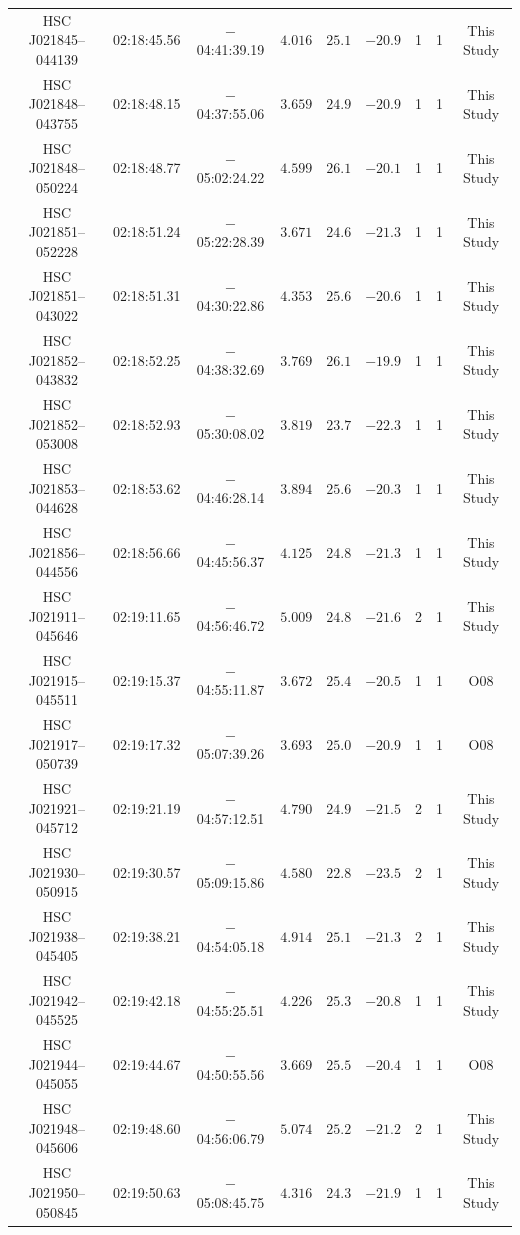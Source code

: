 \documentclass[]{pasj01}
\begin{document}
{\begin{longtable}{ccccccccc}
HSC J021845--044139 & 02:18:45.56 & $-$04:41:39.19 & $4.016$ & $25.1$ & $-20.9$ & 1 & 1 & This Study \\
HSC J021848--043755 & 02:18:48.15 & $-$04:37:55.06 & $3.659$ & $24.9$ & $-20.9$ & 1 & 1 & This Study \\
HSC J021848--050224 & 02:18:48.77 & $-$05:02:24.22 & $4.599$ & $26.1$ & $-20.1$ & 1 & 1 & This Study \\
HSC J021851--052228 & 02:18:51.24 & $-$05:22:28.39 & $3.671$ & $24.6$ & $-21.3$ & 1 & 1 & This Study \\
HSC J021851--043022 & 02:18:51.31 & $-$04:30:22.86 & $4.353$ & $25.6$ & $-20.6$ & 1 & 1 & This Study \\
HSC J021852--043832 & 02:18:52.25 & $-$04:38:32.69 & $3.769$ & $26.1$ & $-19.9$ & 1 & 1 & This Study \\
HSC J021852--053008 & 02:18:52.93 & $-$05:30:08.02 & $3.819$ & $23.7$ & $-22.3$ & 1 & 1 & This Study \\
HSC J021853--044628 & 02:18:53.62 & $-$04:46:28.14 & $3.894$ & $25.6$ & $-20.3$ & 1 & 1 & This Study \\
HSC J021856--044556 & 02:18:56.66 & $-$04:45:56.37 & $4.125$ & $24.8$ & $-21.3$ & 1 & 1 & This Study \\
HSC J021911--045646 & 02:19:11.65 & $-$04:56:46.72 & $5.009$ & $24.8$ & $-21.6$ & 2 & 1 & This Study \\
HSC J021915--045511 & 02:19:15.37 & $-$04:55:11.87 & $3.672$ & $25.4$ & $-20.5$ & 1 & 1 & O08 \\
HSC J021917--050739 & 02:19:17.32 & $-$05:07:39.26 & $3.693$ & $25.0$ & $-20.9$ & 1 & 1 & O08 \\
HSC J021921--045712 & 02:19:21.19 & $-$04:57:12.51 & $4.790$ & $24.9$ & $-21.5$ & 2 & 1 & This Study \\
HSC J021930--050915 &  02:19:30.57  &  $-$05:09:15.86  & $4.580$ & $22.8$ & $-23.5$ & 2 & 1 & This Study \\
HSC J021938--045405 & 02:19:38.21 & $-$04:54:05.18 & $4.914$ & $25.1$ & $-21.3$ & 2 & 1 & This Study \\
HSC J021942--045525 & 02:19:42.18 & $-$04:55:25.51 & $4.226$ & $25.3$ & $-20.8$ & 1 & 1 & This Study \\
HSC J021944--045055 & 02:19:44.67 & $-$04:50:55.56 & $3.669$ & $25.5$ & $-20.4$ & 1 & 1 & O08 \\
HSC J021948--045606 & 02:19:48.60 & $-$04:56:06.79 & $5.074$ & $25.2$ & $-21.2$ & 2 & 1 & This Study \\
HSC J021950--050845 & 02:19:50.63 & $-$05:08:45.75 & $4.316$ & $24.3$ & $-21.9$ & 1 & 1 & This Study \\

\end{longtable}}
\end{document}
